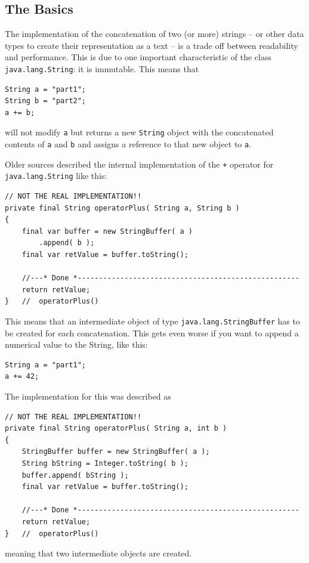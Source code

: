 \documentclass[11pt,a4paper, titlepage, parskip=half, headsepline, footsepline, cleardoublepage=current, headheight=1cm]{scrbook}
\begin{document}
\subsection{The Basics}
The implementation of the concatenation of two (or more) strings – or other data types to create their representation as a text – is a trade off between readability and performance. This is due to one important characteristic of the class \lstinline|java.lang.String|\autocite{ORACLE_DOC_STRING_CLASS}: it is immutable. This means that
\begin{lstlisting}
String a = "part1";
String b = "part2";
a += b;
\end{lstlisting}
will not modify \lstinline|a| but returns a new \lstinline|String| object with the concatenated contents of \lstinline|a| and \lstinline|b| and assigns a reference to that new object to \lstinline|a|.

Older sources described the internal implementation of the \lstinline|+| operator for \lstinline|java.lang.String| like this:
\begin{lstlisting}
// NOT THE REAL IMPLEMENTATION!!
private final String operatorPlus( String a, String b )
{
    final var buffer = new StringBuffer( a )
        .append( b );
    final var retValue = buffer.toString();
    
    //---* Done *----------------------------------------------------
    return retValue;
}   //  operatorPlus()
\end{lstlisting}

This means that an intermediate object of type \lstinline|java.lang.StringBuffer|\autocite{ORACLE_DOC_STRINGBUFFER_CLASS} has to be created for each concatenation. This gets even worse if you want to append a numerical value to the String, like this:
\begin{lstlisting}
String a = "part1";
a += 42;
\end{lstlisting}

The implementation for this was described as
\begin{lstlisting}
// NOT THE REAL IMPLEMENTATION!!
private final String operatorPlus( String a, int b )
{
    StringBuffer buffer = new StringBuffer( a );
    String bString = Integer.toString( b );
    buffer.append( bString );
    final var retValue = buffer.toString();
    
    //---* Done *----------------------------------------------------
    return retValue;
}   //  operatorPlus()
\end{lstlisting}
meaning that two intermediate objects are created.
\end{document}
